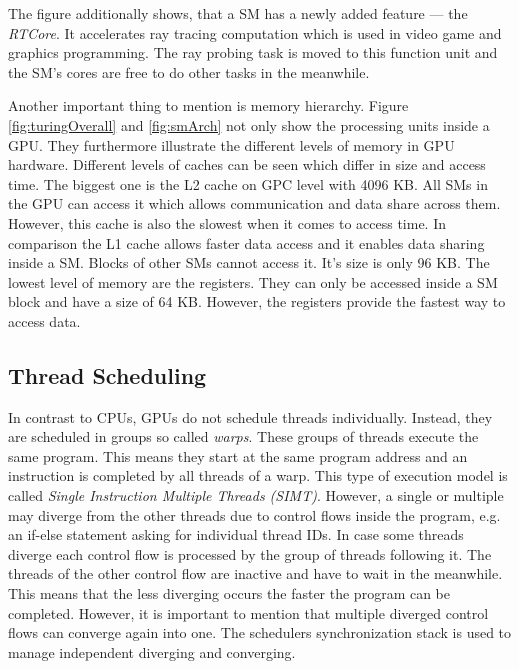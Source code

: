 \documentclass[a4paper,12pt]{llncs}
\numberwithin{equation}{section}
\begin{document}
  The figure additionally shows, that a SM has a newly added feature --- the \textit{RTCore}.
  It accelerates ray tracing computation which is used in video game and graphics programming.
  The ray probing task is moved to this function unit and the SM's cores are free to do other tasks in the meanwhile.
  
 Another important thing to mention is memory hierarchy.
 Figure \ref{fig:turingOverall} and \ref{fig:smArch} not only show the processing units inside a GPU.
 They furthermore illustrate the different levels of memory in GPU hardware.
 Different levels of caches can be seen which differ in size and access time.
 The biggest one is the L2 cache on GPC level with 4096 KB.
 All SMs in the GPU can access it which allows communication and data share across them.
 However, this cache is also the slowest when it comes to access time.
 In comparison the L1 cache allows faster data access and it enables data sharing inside a SM.
 Blocks of other SMs cannot access it. 
 It's size is only 96 KB.
 The lowest level of memory are the registers.
 They can only be accessed inside a SM block and have a size of 64 KB.
 However, the registers provide the fastest way to access data.~\cite{Huang.2008}~\cite{NVIDIA.2019}
        


\subsection{Thread Scheduling}
\label{subsec:Thr}
  In contrast to CPUs, GPUs do not schedule threads individually.
  Instead, they are scheduled in groups so called \textit{warps}.
  These groups of threads execute the same program.
  This means they start at the same program address and an instruction is completed by all threads of a warp.
  This type of execution model is called \textit{Single Instruction Multiple Threads (SIMT)}.
  However, a single or multiple may diverge from the other threads due to control flows inside the program, e.g. an if-else statement asking for individual thread IDs.
  In case some threads diverge each control flow is processed by the group of threads following it.
  The threads of the other control flow are inactive and have to wait in the meanwhile.
  This means that the less diverging occurs the faster the program can be completed.
  However, it is important to mention that multiple diverged control flows can converge again into one.
  The schedulers synchronization stack is used to manage independent diverging and converging.~\cite{Rauber.2012}~\cite{Lindholm.2008}
\end{document}
